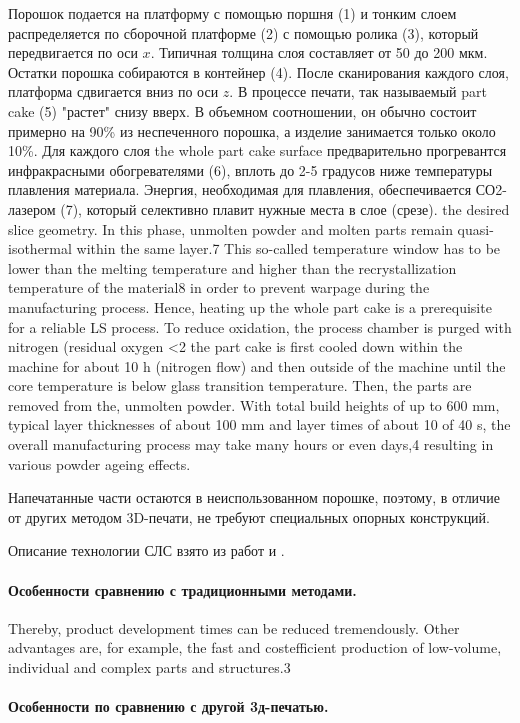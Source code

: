 Порошок подается на платформу с помощью поршня (1) и тонким слоем распределяется по сборочной платформе (2) с помощью ролика (3), который передвигается по оси $x$. Типичная толщина слоя составляет от 50 до 200 мкм. Остатки порошка собираются в контейнер (4). После сканирования каждого слоя, платформа сдвигается вниз по оси $z$. В процессе печати, так называемый part cake (5) "растет" снизу вверх. В объемном соотношении, он обычно состоит примерно на 90\% из неспеченного порошка, а изделие занимается только около 10\%. Для каждого слоя 
 the whole part cake
surface предварительно прогревантся инфракрасными обогревателями  (6), вплоть до 2-5 градусов ниже температуры плавления материала. Энергия, необходимая для плавления, обеспечивается СО2-лазером (7), который селективно плавит нужные места в слое (срезе).  
the desired slice geometry. In this phase,
unmolten powder and molten parts remain quasi-isothermal
within the same layer.7 This so-called temperature window has
to be lower than the melting temperature and higher than the
recrystallization temperature of the material8 in order to prevent
warpage during the manufacturing process. Hence, heating up
the whole part cake is a prerequisite for a reliable LS process.
To reduce oxidation, the process chamber is purged with nitrogen
(residual oxygen <2%
the part cake is first cooled down within the machine for about
10 h (nitrogen flow) and then outside of the machine until the
core temperature is below glass transition temperature. Then,
the parts are removed from the, unmolten powder. With total
build heights of up to 600 mm, typical layer thicknesses of
about 100 mm and layer times of about 10 of 40 s, the overall
manufacturing process may take many hours or even days,4
resulting in various powder ageing effects.

Напечатанные части остаются в неиспользованном порошке, поэтому, в отличие от других методом 3D-печати, не требуют специальных опорных конструкций.

Описание технологии СЛС взято из работ \cite{ageing} и \cite{sls-material}.

\paragraph{Особенности сравнению с традиционными методами.}
Thereby, product development times can be reduced tremendously.
Other advantages are, for example, the fast and costefficient
production of low-volume, individual and complex parts
and structures.3
\paragraph{Особенности по сравнению с другой 3д-печатью.}

